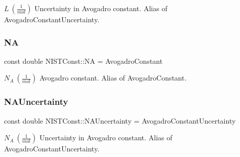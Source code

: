 $L \ (\frac{1}{mol})$ Uncertainty in Avogadro constant. Alias of Avogadro\+Constant\+Uncertainty. \mbox{\label{group___n_i_s_t_const-_avogadro_constant_gad08af58ac1b1ee41e25bd8564a74bc42}} 
\subsubsection{\texorpdfstring{NA}{NA}}
{\footnotesize\ttfamily const double N\+I\+S\+T\+Const\+::\+NA = Avogadro\+Constant}

$N_A \ (\frac{1}{mol})$ Avogadro constant. Alias of Avogadro\+Constant. \mbox{\label{group___n_i_s_t_const-_avogadro_constant_ga37f2994955ace9aed8e44bd3699f0b50}} 
\subsubsection{\texorpdfstring{N\+A\+Uncertainty}{NAUncertainty}}
{\footnotesize\ttfamily const double N\+I\+S\+T\+Const\+::\+N\+A\+Uncertainty = Avogadro\+Constant\+Uncertainty}

$N_A \ (\frac{1}{mol})$ Uncertainty in Avogadro constant. Alias of Avogadro\+Constant\+Uncertainty. 
